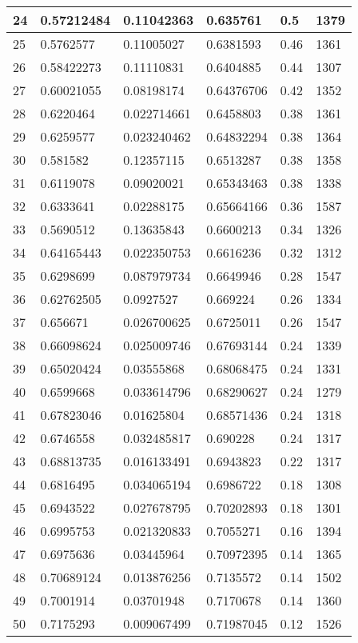 \begin{longtable}{|l|l|l|l|l|l|}
24 & 0.57212484 & 0.11042363 & 0.635761 & 0.5 & 1379 \\ \hline 
25 & 0.5762577 & 0.11005027 & 0.6381593 & 0.46 & 1361 \\ \hline 
26 & 0.58422273 & 0.11110831 & 0.6404885 & 0.44 & 1307 \\ \hline 
27 & 0.60021055 & 0.08198174 & 0.64376706 & 0.42 & 1352 \\ \hline 
28 & 0.6220464 & 0.022714661 & 0.6458803 & 0.38 & 1361 \\ \hline 
29 & 0.6259577 & 0.023240462 & 0.64832294 & 0.38 & 1364 \\ \hline 
30 & 0.581582 & 0.12357115 & 0.6513287 & 0.38 & 1358 \\ \hline 
31 & 0.6119078 & 0.09020021 & 0.65343463 & 0.38 & 1338 \\ \hline 
32 & 0.6333641 & 0.02288175 & 0.65664166 & 0.36 & 1587 \\ \hline 
33 & 0.5690512 & 0.13635843 & 0.6600213 & 0.34 & 1326 \\ \hline 
34 & 0.64165443 & 0.022350753 & 0.6616236 & 0.32 & 1312 \\ \hline 
35 & 0.6298699 & 0.087979734 & 0.6649946 & 0.28 & 1547 \\ \hline 
36 & 0.62762505 & 0.0927527 & 0.669224 & 0.26 & 1334 \\ \hline 
37 & 0.656671 & 0.026700625 & 0.6725011 & 0.26 & 1547 \\ \hline 
38 & 0.66098624 & 0.025009746 & 0.67693144 & 0.24 & 1339 \\ \hline 
39 & 0.65020424 & 0.03555868 & 0.68068475 & 0.24 & 1331 \\ \hline 
40 & 0.6599668 & 0.033614796 & 0.68290627 & 0.24 & 1279 \\ \hline 
41 & 0.67823046 & 0.01625804 & 0.68571436 & 0.24 & 1318 \\ \hline 
42 & 0.6746558 & 0.032485817 & 0.690228 & 0.24 & 1317 \\ \hline 
43 & 0.68813735 & 0.016133491 & 0.6943823 & 0.22 & 1317 \\ \hline 
44 & 0.6816495 & 0.034065194 & 0.6986722 & 0.18 & 1308 \\ \hline 
45 & 0.6943522 & 0.027678795 & 0.70202893 & 0.18 & 1301 \\ \hline 
46 & 0.6995753 & 0.021320833 & 0.7055271 & 0.16 & 1394 \\ \hline 
47 & 0.6975636 & 0.03445964 & 0.70972395 & 0.14 & 1365 \\ \hline 
48 & 0.70689124 & 0.013876256 & 0.7135572 & 0.14 & 1502 \\ \hline 
49 & 0.7001914 & 0.03701948 & 0.7170678 & 0.14 & 1360 \\ \hline 
50 & 0.7175293 & 0.009067499 & 0.71987045 & 0.12 & 1526 \\ \hline 
\end{longtable}